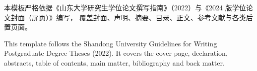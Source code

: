 \documentclass[
  master,
  fontset=windows,
]{sduthesis}
\begin{document}
\maketitle
\makestatement

\clearpage
{}
\setcounter{page}{1}

\begin{cnabstract}
本模板严格依据《山东大学研究生学位论文撰写指南》（2022）与《2024 版学位论文封面（扉页）》编写，
覆盖封面、声明、摘要、目录、正文、参考文献与各类后置页面。

\end{cnabstract}

\begin{enabstract}
This template follows the Shandong University Guidelines for Writing Postgraduate
Degree Theses (2022). It covers the cover page, declaration, abstracts, table of
contents, main matter, bibliography and back matter.

\end{enabstract}

\tableofcontents
\tableofengcontents



\clearpage
{}
\setcounter{page}{1}








\printbibliography[heading=bibintoc,title={参考文献}]



% 

% 

% 
\end{document}
